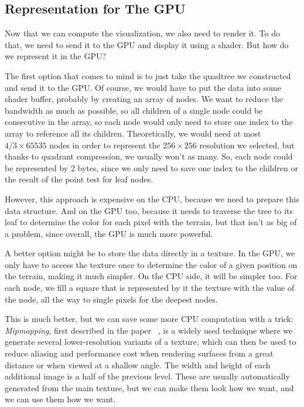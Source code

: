 \subsection{Representation for The GPU}

Now that we can compute the visualization, we also need to render it.
To do that, we need to send it to the GPU and display it using a shader.
But how do we represent it in the GPU?

The first option that comes to mind is to just take the quadtree we constructed and send it to the GPU.
Of course, we would have to put the data into some shader buffer, probably by creating an array of nodes.
We want to reduce the bandwidth as much as possible, so all children of a single node could be consecutive in the array, so each node would only need to store one index to the array to reference all its children.
Theoretically, we would need at most $4/3 \times 65535$ nodes in order to represent the $256 \times 256$ resolution we selected, but thanks to quadrant compression, we usually won't as many.
So, each node could be represented by 2 bytes, since we only need to save one index to the children or the result of the point test for leaf nodes.

However, this approach is expensive on the CPU, because we need to prepare this data structure.
And on the GPU too, because it needs to traverse the tree to its leaf to determine the color for each pixel with the terrain, but that isn't as big of a problem, since overall, the GPU is much more powerful.

A better option might be to store the data directly in a texture.
In the GPU, we only have to access the texture once to determine the color of a given position on the terrain, making it much simpler.
On the CPU side, it will be simpler too.
For each node, we fill a square that is represented by it the texture with the value of the node, all the way to single pixels for the deepest nodes.

This is much better, but we can save some more CPU computation with a trick:
\emph{Mipmapping}, first described in the paper ~\cite{Mipmaps}, is a widely used technique where we generate several lower-resolution variants of a texture, which can then be used to reduce aliasing and performance cost when rendering surfaces from a great distance or when viewed at a shallow angle.
The width and height of each additional image is a half of the previous level.
These are usually automatically generated from the main texture, but we can make them look how we want, and we can use them how we want.

